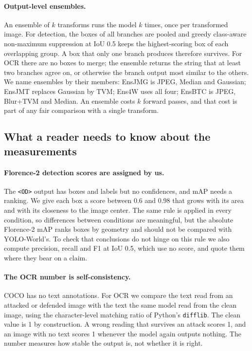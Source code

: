 \documentclass[11pt]{article}
\newcommand{\yw}{YOLO-World}
\newcommand{\fl}{Florence-2}
\begin{document}
\paragraph{Output-level ensembles.} An ensemble of $k$ transforms runs the
model $k$ times, once per transformed image. For detection, the boxes of all
branches are pooled and greedy class-aware non-maximum suppression at IoU 0.5
keeps the highest-scoring box of each overlapping group. A box that only one
branch produces therefore survives. For OCR there are no boxes to merge; the
ensemble returns the string that at least two branches agree on, or otherwise
the branch output most similar to the others. We name ensembles by their
members: EnsJMG is JPEG, Median and Gaussian; EnsJMT replaces Gaussian by
TVM; Ens4W uses all four; EnsBTC is JPEG, Blur+TVM and Median. An ensemble
costs $k$ forward passes, and that cost is part of any fair comparison with
a single transform.

\subsection{What a reader needs to know about the measurements}
\label{sec:disclosures}

\paragraph{\fl{} detection scores are assigned by us.} The \texttt{<OD>}
output has boxes and labels but no confidences, and mAP needs a ranking. We
give each box a score between 0.6 and 0.98 that grows with its area and with
its closeness to the image center. The same rule is applied in every
condition, so differences between conditions are meaningful, but the
absolute \fl{} mAP ranks boxes by geometry and should not be compared with
\yw{}'s. To check that conclusions do not hinge on this rule we also compute
precision, recall and F1 at IoU 0.5, which use no score, and quote them where
they bear on a claim.

\paragraph{The OCR number is self-consistency.} COCO has no text
annotations. For OCR we compare the text read from an attacked or defended
image with the text the same model read from the clean image, using the
character-level matching ratio of Python's \texttt{difflib}. The clean value
is 1 by construction. A wrong reading that survives an attack scores 1, and
an image with no text scores 1 whenever the model again outputs nothing. The
number measures how stable the output is, not whether it is right.
\end{document}

